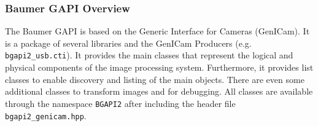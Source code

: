 \subsubsection{Baumer GAPI Overview}
\label{subsubsec:baumer_gapi_overview}

The Baumer GAPI is based on the Generic Interface for Cameras (GenICam).
It is a package of several libraries and the GenICam Producers (e.g. \texttt{bgapi2\_usb.cti}).
It provides the main classes that represent the logical and physical components of the image processing system.
Furthermore, it provides list classes to enable discovery and listing of the main objects.
There are even some additional classes to transform images and for debugging.
All classes are available through the namespace \texttt{BGAPI2} after including the header file \texttt{bgapi2\_genicam.hpp}.

